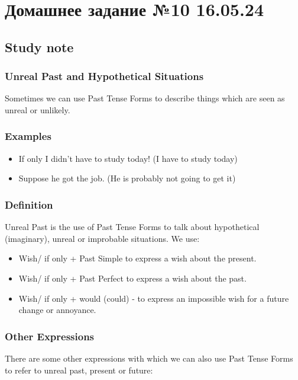 \chapter{Домашнее задание №10 16.05.24}

\section{Study note}
\subsection*{Unreal Past and Hypothetical Situations}

Sometimes we can use Past Tense Forms to describe things which are seen as unreal or unlikely.

\subsection*{Examples}

\begin{itemize}
      \item If only I didn’t have to study today! (I have to study today)
      \item Suppose he got the job. (He is probably not going to get it)
\end{itemize}

\subsection*{Definition}

Unreal Past is the use of Past Tense Forms to talk about hypothetical (imaginary), unreal or improbable situations. We use:

\begin{itemize}
      \item Wish/ if only + Past Simple to express a wish about the present.
      \item Wish/ if only + Past Perfect to express a wish about the past.
      \item Wish/ if only + would (could) - to express an impossible wish for a future change or annoyance.
\end{itemize}

\subsection*{Other Expressions}

There are some other expressions with which we can also use Past Tense Forms to refer to unreal past, present or future:

